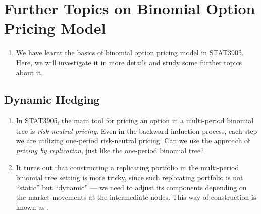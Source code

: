 \section{Further Topics on Binomial Option Pricing Model}
\label{sect:binom-model-further}
\begin{enumerate}
\item We have learnt the basics of binomial option pricing model in STAT3905.
Here, we will investigate it in more details and study some further topics
about it.
\end{enumerate}
\subsection{Dynamic Hedging}
\label{subsect:dynamic-hedging}
\begin{enumerate}
\item In STAT3905, the main tool for pricing an option in a multi-period
binomial tree is \emph{risk-neutral pricing}. Even in the backward induction
process, each step we are utilizing one-period risk-neutral pricing. Can we use
the approach of \emph{pricing by replication}, just like the one-period
binomial tree?

\item It turns out that constructing a replicating portfolio in the
multi-period binomial tree setting is more tricky, since such replicating
portfolio is not ``static'' but ``dynamic'' --- we need to adjust its
components depending on the market movements at the intermediate nodes. This
way of construction is known as .

\begin{center}
\end{center}


\end{enumerate}
